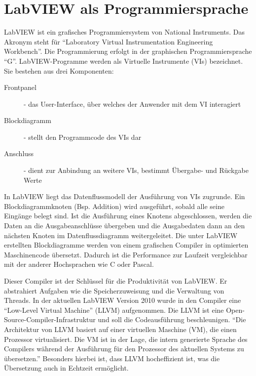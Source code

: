 \section{LabVIEW als Programmiersprache}
	\label{sec:labview}
	
LabVIEW ist ein grafisches Programmiersystem von National Instruments. Das Akronym steht für "`Laboratory Virtual Instrumentation Engineering Workbench"'.
Die Programmierung erfolgt in der graphischen Programmiersprache "`G"'.  LabVIEW-Programme werden als Virtuelle Instrumente (VIs) bezeichnet. \cite{ni-tuto} %
Sie bestehen aus drei Komponenten: 
\begin{description}
	\item[Frontpanel] - das User-Interface, über welches der Anwender mit dem VI interagiert
	\item[Blockdiagramm] - stellt den Programmcode des VIs dar
	\item[Anschluss] - dient zur Anbindung an weitere VIs, bestimmt Übergabe- und Rückgabe Werte
\end{description}

In LabVIEW liegt das Datenflussmodell der Ausführung von VIs  zugrunde. Ein Blockdiagrammknoten (Bsp. Addition) wird ausgeführt, sobald alle seine Eingänge belegt sind. 
Ist die Ausführung eines Knotens abgeschlossen, werden die Daten an die Ausgabeanschlüsse übergeben und die Ausgabedaten dann an den nächsten Knoten 
im Datenflussdiagramm weitergeleitet. \cite{labview-buch01}
Die unter LabVIEW erstellten Blockdiagramme werden von einem grafischen Compiler in optimierten Maschinencode übersetzt. 
Dadurch ist die Performance zur Laufzeit vergleichbar mit der anderer Hochsprachen wie C oder Pascal. 

Dieser Compiler ist der Schlüssel für die Produktivität von LabVIEW. Er abstrahiert Aufgaben wie die Speicherzuweisung und die Verwaltung von Threads. In der aktuellen LabVIEW Version 2010 wurde in den Compiler eine  "`Low-Level Virtual Machine"' (LLVM) aufgenommen. Die LLVM ist eine Open-Source-Compiler-Infrastruktur und soll die Codeausführung  beschleunigen. 
"`Die Architektur von LLVM basiert auf einer virtuellen Maschine (VM), die einen Prozessor virtualisiert. Die VM ist in der Lage, die intern generierte Sprache des Compilers während der Ausführung für den Prozessor des aktuellen Systems zu übersetzen."'\cite{lattner} Besonders hierbei ist, dass LLVM hocheffizient ist, was die Übersetzung auch in Echtzeit ermöglicht. \cite{llvm} \cite{ni-compiler}


